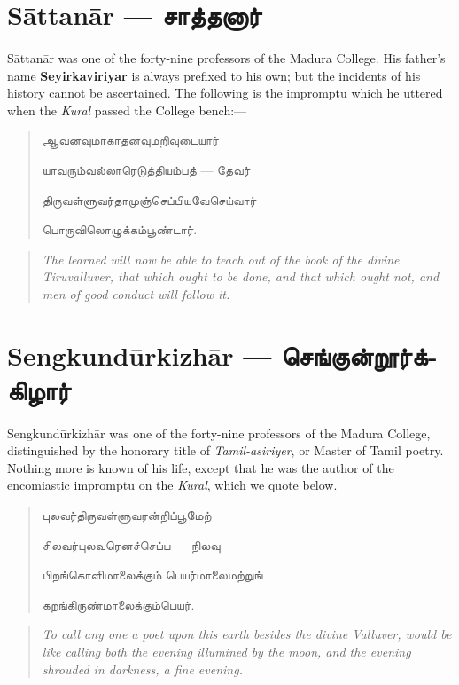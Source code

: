 \documentclass{article}
\newcommand{\TamilText}[1]{\texttamil{#1}}
\newcommand{\TamilBold}[1]{\texttamil{\textbf{#1}}}
\newcommand{\tam}[1]{\TamilText{#1}}
\newcommand{\tambold}[1]{\TamilBold{#1}}
\begin{document}
\section{S\={a}ttan\={a}r --- \tambold{சாத்தனார்}}
\paragraph{}
S\={a}ttan\={a}r was one of the forty-nine professors of the Madura College. His father's name \textbf{Seyirkaviriyar} is always prefixed to his own; but the incidents of his history cannot be ascertained. The following is the impromptu which he uttered when the \emph{Kural} passed the College bench:---
\begin{quotation}\small
\tam{ஆவனவுமாகாதனவுமறிவுடையார்‌}

\tam{யாவரும்வல்லாரெடுத்தியம்பத்‌} --- \tam{தேவர்}

\tam{திருவள்ளுவர்தாமுஞ்செப்‌பியவேசெய்வார்‌}

\tam{பொருவிலொழுக்கம்பூண்டார்‌}.
\end{quotation}
\begin{quotation}\small
\emph{The learned will now be able to teach out of the book of the divine Tiruvalluver, that which ought to be done, and that which ought not, and men of good conduct will follow it.}
\end{quotation}

\section{Sengkund\={u}rkizh\={a}r --- \tambold{செங்குன்றூர்க்கிழார்}}
\paragraph{}
Sengkund\={u}rkizh\={a}r was one of the forty-nine professors of the Madura College, distinguished by the honorary title of \emph{Tamil-asiriyer}, or Master of Tamil poetry. Nothing more is known of his life, except that he was the author of the encomiastic impromptu on the \emph{Kural}, which we quote below.
\begin{quotation}\small
\tam{புலவர்திருவள்ளுவரன்றிப்‌பூமேற்‌}

\tam{சிலவர்புலவரெனச்செப்ப} --- \tam{நிலவு}

\tam{பிறங்கொளிமாலைக்கும்‌ பெயர்மாலைமற்றுங்‌}

\tam{கறங்கிருண்மாலைக்கும்பெயர்‌}.
\end{quotation}
\begin{quotation}\small
\emph{To call any one a poet upon this earth besides the divine Valluver, would be like calling both the evening illumined by the moon, and the evening shrouded in darkness, a fine evening.}
\end{quotation}
\end{document}
